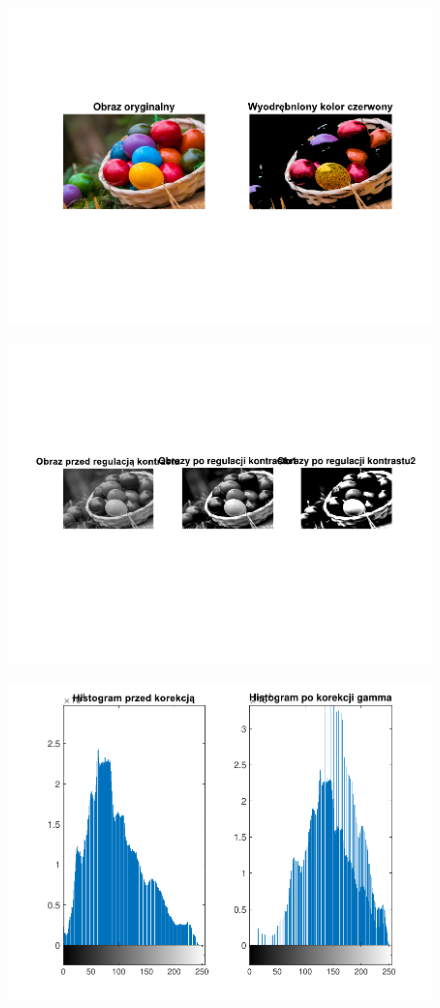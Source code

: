 \documentclass[10pt,a4paper,twoside,twocolumn]{article}%
\begin{document}
\begin{figure}[H]\centering\includegraphics[width=0.9\linewidth]{kod/my_figure16.pdf}\label{fig:my_figure16.pdf}\end{figure}

\begin{figure}[H]\centering\includegraphics[width=0.9\linewidth]{kod/my_figure17.pdf}\label{fig:my_figure17.pdf}\end{figure}

\begin{figure}[H]\centering\includegraphics[width=0.9\linewidth]{kod/my_figure18.pdf}\label{fig:my_figure18.pdf}\end{figure}
\end{document}
